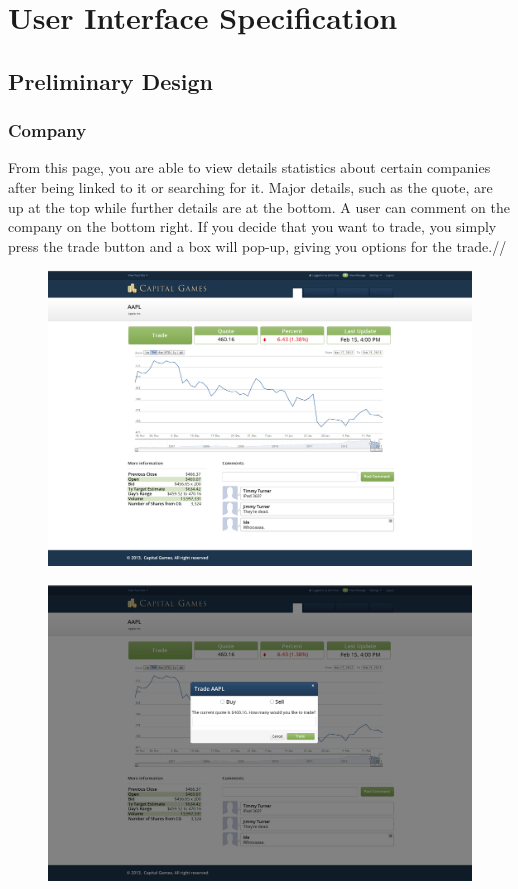 \chapter{User Interface Specification}

\section{Preliminary Design}

\subsection{Company}
From this page, you are able to view details statistics about certain companies after being linked to it or searching for it. Major details, such as the quote, are up at the top while further details are at the bottom. A user can comment on the company on the bottom right. If you decide that you want to trade, you simply press the trade button and a box will pop-up, giving you options for the trade.//
\begin{figure}
\centering
\includegraphics[width=5.5in]{./mockups/JPEG/company.jpg}
\end{figure}
\begin{figure}
\centering
\includegraphics[width=5.5in]{./mockups/JPEG/Trade_popup.jpg}
\end{figure}

